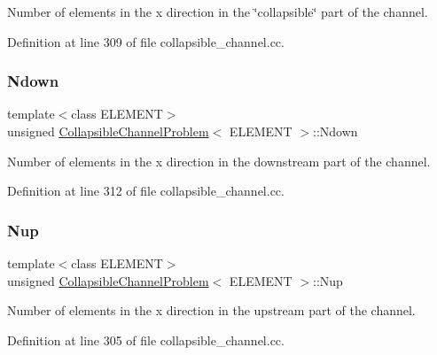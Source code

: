 Number of elements in the x direction in the \char`\"{}collapsible\char`\"{} part of the channel. 



Definition at line 309 of file collapsible\+\_\+channel.\+cc.

\mbox{\label{classCollapsibleChannelProblem_ac3991835635f02f895ea35adc7d985dc}} 
\subsubsection{\texorpdfstring{Ndown}{Ndown}}
{\footnotesize\ttfamily template$<$class E\+L\+E\+M\+E\+NT$>$ \\
unsigned \hyperlink{classCollapsibleChannelProblem}{Collapsible\+Channel\+Problem}$<$ E\+L\+E\+M\+E\+NT $>$\+::Ndown\hspace{0.3cm}{\ttfamily [private]}}



Number of elements in the x direction in the downstream part of the channel. 



Definition at line 312 of file collapsible\+\_\+channel.\+cc.

\mbox{\label{classCollapsibleChannelProblem_a512e07ac795b19bfed9f82fd7927e8f9}} 
\subsubsection{\texorpdfstring{Nup}{Nup}}
{\footnotesize\ttfamily template$<$class E\+L\+E\+M\+E\+NT$>$ \\
unsigned \hyperlink{classCollapsibleChannelProblem}{Collapsible\+Channel\+Problem}$<$ E\+L\+E\+M\+E\+NT $>$\+::Nup\hspace{0.3cm}{\ttfamily [private]}}



Number of elements in the x direction in the upstream part of the channel. 



Definition at line 305 of file collapsible\+\_\+channel.\+cc.

